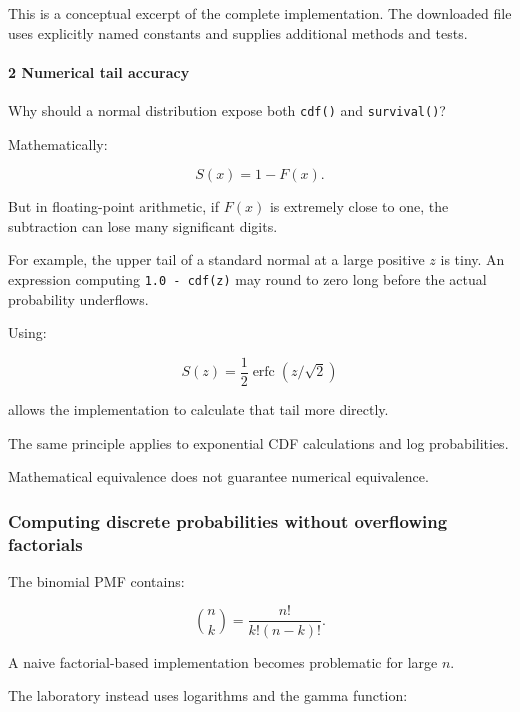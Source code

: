 This is a conceptual excerpt of the complete implementation. The downloaded file uses explicitly named constants and supplies additional methods and tests.

\paragraph{2 Numerical tail accuracy}\label{numerical-tail-accuracy}

Why should a normal distribution expose both \texttt{cdf()} and \texttt{survival()}?

Mathematically:

\[
 S(x)=1-F(x).
\]

But in floating-point arithmetic, if \(F(x)\) is extremely close to one, the subtraction can lose many significant digits.

For example, the upper tail of a standard normal at a large positive \(z\) is tiny. An expression computing \texttt{1.0\ -\ cdf(z)} may round to zero long before the actual probability underflows.

Using:

\[
 S(z)=\frac12\operatorname{erfc}(z/\sqrt2)
\]

allows the implementation to calculate that tail more directly.

The same principle applies to exponential CDF calculations and log probabilities.

Mathematical equivalence does not guarantee numerical equivalence.

\subsubsection{Computing discrete probabilities without overflowing factorials}\label{computing-discrete-probabilities-without-overflowing-factorials}

The binomial PMF contains:

\[
 \binom nk= \frac{n!}{k!(n-k)!}.
\]

A naive factorial-based implementation becomes problematic for large \(n\).

The laboratory instead uses logarithms and the gamma function:


